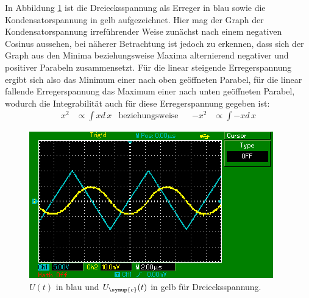 In Abbildung \ref{fig:int_drei} ist die Dreiecksspannung
als Erreger in blau sowie die Kondensatorspannung in gelb aufgezeichnet.
Hier mag der Graph der Kondensatorspannung irreführender Weise zunächst
nach einem negativen Cosinus aussehen, bei näherer Betrachtung ist jedoch zu
erkennen, dass sich der Graph aus den Minima beziehungsweise Maxima
alternierend negativer und positiver Parabeln zusammensetzt.
Für die linear steigende Erregerspannung ergibt sich also das Minimum einer
nach oben geöffneten Parabel, für die linear fallende Erregerspannung
das Maximum einer nach unten geöffneten Parabel, wodurch die Integrabilität
auch für diese Erregerspannung gegeben ist:
\begin{align}
  x^2 &\propto \int x d\, x &\text{beziehungsweise}&& -x^2 &\propto \int -x d\, x
\end{align}
\begin{figure}[H]
  \centering
  \includegraphics{content/images/d/dreieck.png}
  \caption{$U(t)$ in blau und $U_\symup{c}(t)$ in gelb für Dreiecksspannung.}
  \label{fig:int_drei}
\end{figure}
